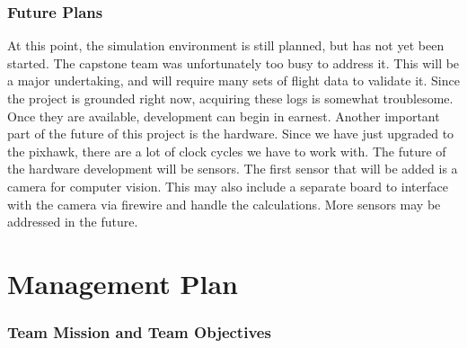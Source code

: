\documentclass[12pt]{article}
\begin{document}
\subsubsection{Future Plans}
	At this point, the simulation environment is still planned, but has not yet been started. The capstone team was unfortunately too busy to address it. This will be a major undertaking, and will require many sets of flight data to validate it. Since the project is grounded right now, acquiring these logs is somewhat troublesome. Once they are available, development can begin in earnest.
	Another important part of the future of this project is the hardware. Since we have just upgraded to the pixhawk, there are a lot of clock cycles we have to work with. The future of the hardware development will be sensors. The first sensor that will be added is a camera for computer vision. This may also include a separate board to interface with the camera via firewire and handle the calculations. More sensors may be addressed in the future.

\section{Management Plan}
\subsubsection{Team Mission and Team Objectives}
\end{document}
